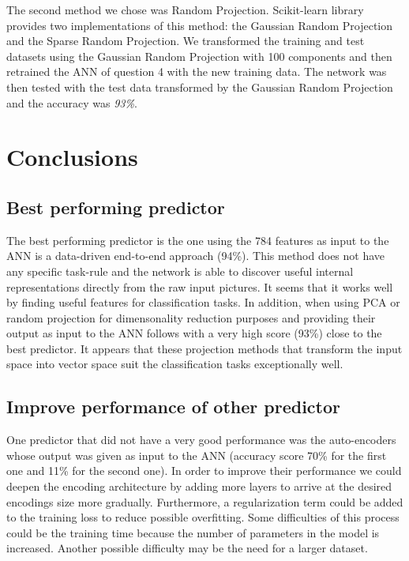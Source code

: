 \documentclass[12pt]{article}
\begin{document}
	The second method we chose was Random Projection. Scikit-learn library provides two implementations of this method: the Gaussian Random Projection and the Sparse Random Projection. We transformed the training and test datasets using the Gaussian Random Projection with 100 components and then retrained the ANN of question 4 with the new training data. The network was then tested with the test data transformed by the Gaussian Random Projection and the accuracy was \emph{93\%}.
	
	\section{Conclusions}
	
	\subsection{Best performing predictor}
	
	The best performing predictor is the one using the 784 features as input to the ANN is a data-driven end-to-end approach (94\%). This method does not have any specific task-rule and the network is able to discover useful internal representations directly from the raw input pictures. It seems that it works well by finding useful features for classification tasks. In addition, when using PCA or random projection for dimensonality reduction purposes and providing their output as input to the ANN follows with a very high score (93\%) close to the best predictor. It appears that these projection methods that transform the input space into vector space suit the classification tasks exceptionally well.
	
	\subsection{Improve performance of other predictor}
	
	One predictor that did not have a very good performance was the auto-encoders whose output was given as input to the ANN (accuracy score 70\% for the first one and 11\% for the second one). In order to improve their performance we could deepen the encoding architecture by adding more layers to arrive at the desired encodings size more gradually. Furthermore, a regularization term could be added to the training loss to reduce possible overfitting. Some difficulties of this process could be the training time because the number of parameters in the model is increased. Another possible difficulty may be the need for a larger dataset. 
	
\end{document}
